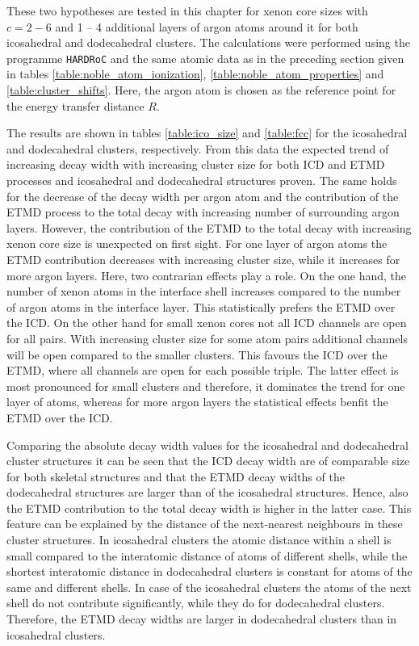 These two hypotheses are tested in this chapter for xenon core sizes
with $c= 2-6$ and 1 -- 4 additional layers of argon atoms around it for
both icosahedral and dodecahedral clusters.
The calculations were performed using the programme \verb|HARDRoC|
\cite{HARDRoC} and the same atomic data as in the preceding section
given in tables \ref{table:noble_atom_ionization},
\ref{table:noble_atom_properties} and \ref{table:cluster_shifts}.
Here, the argon atom is chosen as the reference point for the energy
transfer distance $R$.

The results are shown in tables \ref{table:ico_size} and \ref{table:fcc}
for the icosahedral and dodecahedral clusters, respectively.
From this data the expected trend of increasing decay width with
increasing cluster size for both \ac{ICD} and \ac{ETMD} processes and
icosahedral and dodecahedral structures proven. The same holds for
the decrease of the decay width per argon atom and the contribution of the \ac{ETMD}
process to the total decay with increasing number
of surrounding argon layers.
However, the contribution of the \ac{ETMD} to the total decay with increasing
xenon core size is unexpected on first sight. For one layer of argon atoms
the ETMD contribution decreases with increasing cluster size, while it
increases for more argon layers. Here, two contrarian effects play a role.
On the one hand, the number of xenon atoms in the interface shell increases
compared to the number of argon atoms in the interface layer. This statistically
prefers the ETMD over the ICD. On the other hand for small xenon cores not all
ICD channels are open for all pairs. With increasing cluster size for some
atom pairs additional channels will be open compared to the smaller clusters.
This favours the ICD over the ETMD, where all channels are open for each
possible triple. The latter effect is most pronounced for small clusters and
therefore, it dominates the trend for one layer of atoms, whereas for more
argon layers the statistical effects benfit the ETMD over the ICD.

Comparing the absolute decay width values for the icosahedral and dodecahedral
cluster structures it can be seen that the ICD decay width are of comparable size
for both skeletal structures and that the ETMD decay widths of the dodecahedral
structures are larger than of the icosahedral structures. Hence, also the
ETMD contribution to the total decay width is higher in the latter case.
This feature can be explained by the distance of the next-nearest neighbours
in these cluster structures. In icosahedral clusters the atomic distance
within a shell is small compared to the interatomic distance of atoms
of different shells, while the shortest interatomic distance
in dodecahedral clusters
is constant for atoms of the same and different shells. In case of the icosahedral
clusters the atoms of the next shell do not contribute significantly, while
they do for dodecahedral clusters. Therefore, the ETMD decay widths are larger
in dodecahedral clusters than in icosahedral clusters.



